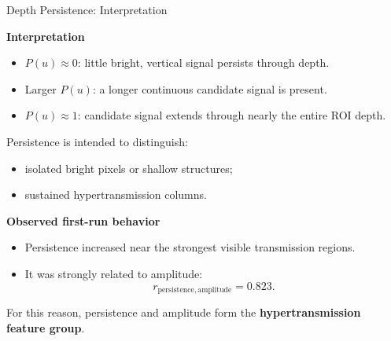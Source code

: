 \documentclass[aspectratio=169]{beamer}
\begin{document}
\begin{frame}{Depth Persistence: Interpretation}

\textbf{Interpretation}

\begin{itemize}
    \item \(P(u)\approx 0\): little bright, vertical signal persists through
    depth.
    \item Larger \(P(u)\): a longer continuous candidate signal is present.
    \item \(P(u)\approx 1\): candidate signal extends through nearly the entire
    ROI depth.
\end{itemize}

\vspace{0.3cm}

Persistence is intended to distinguish:

\begin{itemize}
    \item isolated bright pixels or shallow structures;
    \item sustained hypertransmission columns.
\end{itemize}

\vspace{0.3cm}

\textbf{Observed first-run behavior}

\begin{itemize}
    \item Persistence increased near the strongest visible transmission
    regions.
    \item It was strongly related to amplitude:
    \[
    r_{\mathrm{persistence,amplitude}}
    =
    0.823.
    \]
\end{itemize}

For this reason, persistence and amplitude form the
\textbf{hypertransmission feature group}.

\end{frame}
\end{document}
